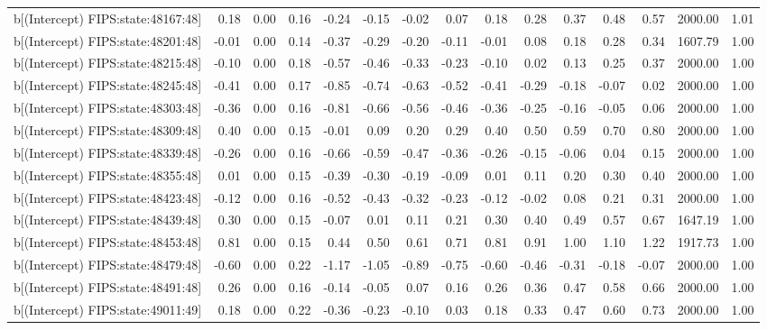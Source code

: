 \begin{table}[ht]
\begin{tabular}{rrrrrrrrrrrrrrr}
  b[(Intercept) FIPS:state:48167:48] & 0.18 & 0.00 & 0.16 & -0.24 & -0.15 & -0.02 & 0.07 & 0.18 & 0.28 & 0.37 & 0.48 & 0.57 & 2000.00 & 1.01 \\ 
  b[(Intercept) FIPS:state:48201:48] & -0.01 & 0.00 & 0.14 & -0.37 & -0.29 & -0.20 & -0.11 & -0.01 & 0.08 & 0.18 & 0.28 & 0.34 & 1607.79 & 1.00 \\ 
  b[(Intercept) FIPS:state:48215:48] & -0.10 & 0.00 & 0.18 & -0.57 & -0.46 & -0.33 & -0.23 & -0.10 & 0.02 & 0.13 & 0.25 & 0.37 & 2000.00 & 1.00 \\ 
  b[(Intercept) FIPS:state:48245:48] & -0.41 & 0.00 & 0.17 & -0.85 & -0.74 & -0.63 & -0.52 & -0.41 & -0.29 & -0.18 & -0.07 & 0.02 & 2000.00 & 1.00 \\ 
  b[(Intercept) FIPS:state:48303:48] & -0.36 & 0.00 & 0.16 & -0.81 & -0.66 & -0.56 & -0.46 & -0.36 & -0.25 & -0.16 & -0.05 & 0.06 & 2000.00 & 1.00 \\ 
  b[(Intercept) FIPS:state:48309:48] & 0.40 & 0.00 & 0.15 & -0.01 & 0.09 & 0.20 & 0.29 & 0.40 & 0.50 & 0.59 & 0.70 & 0.80 & 2000.00 & 1.00 \\ 
  b[(Intercept) FIPS:state:48339:48] & -0.26 & 0.00 & 0.16 & -0.66 & -0.59 & -0.47 & -0.36 & -0.26 & -0.15 & -0.06 & 0.04 & 0.15 & 2000.00 & 1.00 \\ 
  b[(Intercept) FIPS:state:48355:48] & 0.01 & 0.00 & 0.15 & -0.39 & -0.30 & -0.19 & -0.09 & 0.01 & 0.11 & 0.20 & 0.30 & 0.40 & 2000.00 & 1.00 \\ 
  b[(Intercept) FIPS:state:48423:48] & -0.12 & 0.00 & 0.16 & -0.52 & -0.43 & -0.32 & -0.23 & -0.12 & -0.02 & 0.08 & 0.21 & 0.31 & 2000.00 & 1.00 \\ 
  b[(Intercept) FIPS:state:48439:48] & 0.30 & 0.00 & 0.15 & -0.07 & 0.01 & 0.11 & 0.21 & 0.30 & 0.40 & 0.49 & 0.57 & 0.67 & 1647.19 & 1.00 \\ 
  b[(Intercept) FIPS:state:48453:48] & 0.81 & 0.00 & 0.15 & 0.44 & 0.50 & 0.61 & 0.71 & 0.81 & 0.91 & 1.00 & 1.10 & 1.22 & 1917.73 & 1.00 \\ 
  b[(Intercept) FIPS:state:48479:48] & -0.60 & 0.00 & 0.22 & -1.17 & -1.05 & -0.89 & -0.75 & -0.60 & -0.46 & -0.31 & -0.18 & -0.07 & 2000.00 & 1.00 \\ 
  b[(Intercept) FIPS:state:48491:48] & 0.26 & 0.00 & 0.16 & -0.14 & -0.05 & 0.07 & 0.16 & 0.26 & 0.36 & 0.47 & 0.58 & 0.66 & 2000.00 & 1.00 \\ 
  b[(Intercept) FIPS:state:49011:49] & 0.18 & 0.00 & 0.22 & -0.36 & -0.23 & -0.10 & 0.03 & 0.18 & 0.33 & 0.47 & 0.60 & 0.73 & 2000.00 & 1.00 \\ 

\end{tabular}
\end{table}

